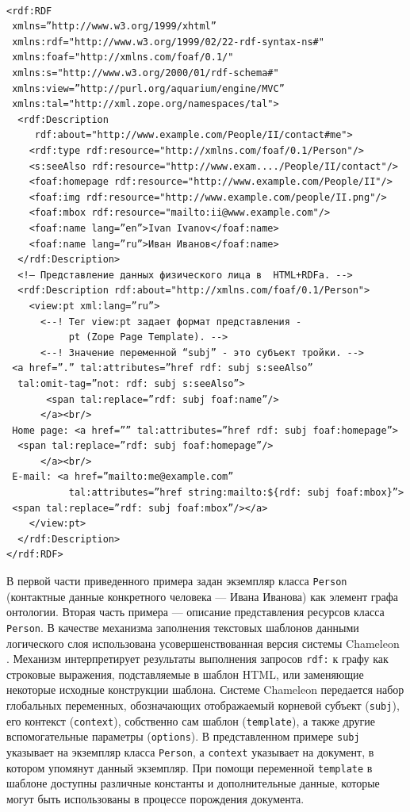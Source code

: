 \documentclass[utf8]{../IncArticle}
\begin{document}
\begingroup%
\tt%
\begin{verbatim}
<rdf:RDF
 xmlns=”http://www.w3.org/1999/xhtml”
 xmlns:rdf="http://www.w3.org/1999/02/22-rdf-syntax-ns#"
 xmlns:foaf="http://xmlns.com/foaf/0.1/"
 xmlns:s="http://www.w3.org/2000/01/rdf-schema#"
 xmlns:view=”http://purl.org/aquarium/engine/MVC”
 xmlns:tal="http://xml.zope.org/namespaces/tal">
  <rdf:Description
     rdf:about="http://www.example.com/People/II/contact#me">
    <rdf:type rdf:resource="http://xmlns.com/foaf/0.1/Person"/>
    <s:seeAlso rdf:resource="http://www.exam..../People/II/contact"/>
    <foaf:homepage rdf:resource="http://www.example.com/People/II"/>
    <foaf:img rdf:resource="http://www.example.com/people/II.png"/>
    <foaf:mbox rdf:resource="mailto:ii@www.example.com"/>
    <foaf:name lang=”en”>Ivan Ivanov</foaf:name>
    <foaf:name lang=”ru”>Иван Иванов</foaf:name>
  </rdf:Description>
  <!— Представление данных физического лица в  HTML+RDFa. -->
  <rdf:Description rdf:about="http://xmlns.com/foaf/0.1/Person">
    <view:pt xml:lang=”ru”>
      <--! Тег view:pt задает формат представления -
           pt (Zope Page Template). -->
      <--! Значение переменной “subj” - это субъект тройки. -->
 <a href=”.” tal:attributes=”href rdf: subj s:seeAlso”
  tal:omit-tag=”not: rdf: subj s:seeAlso”>
       <span tal:replace=”rdf: subj foaf:name”/>
      </a><br/>
 Home page: <a href=”” tal:attributes=”href rdf: subj foaf:homepage”>
  <span tal:replace=”rdf: subj foaf:homepage”/>
      </a><br/>
 E-mail: <a href=”mailto:me@example.com”
           tal:attributes=”href string:mailto:${rdf: subj foaf:mbox}”>
 <span tal:replace=”rdf: subj foaf:mbox”/></a>
    </view:pt>
  </rdf:Description>
</rdf:RDF>
\end{verbatim}%
\endgroup

В первой части приведенного примера задан экземпляр класса
\texttt{Person} (контактные данные конкретного человека --- Ивана
Иванова) как элемент графа онтологии.  Вторая часть примера ---
описание представления ресурсов класса \texttt{Person}.  В качестве
механизма заполнения текстовых шаблонов данными логического слоя
использована усовершенствованная версия системы Chameleon \cite{q2}.
Механизм интерпретирует результаты выполнения запросов \texttt{rdf:} к
графу как строковые выражения, подставляемые в шаблон HTML, или
заменяющие некоторые исходные конструкции шаблона.  Системе Chameleon передается
набор глобальных переменных, обозначающих отображаемый корневой
субъект (\texttt{subj}), его контекст (\texttt{context}), собственно
сам шаблон (\texttt{template}), а также другие вспомогательные
параметры (\texttt{options}).  В представленном примере \texttt{subj}
указывает на экземпляр класса \texttt{Person}, а \texttt{context}
указывает на документ, в котором упомянут данный экземпляр.  При помощи
переменной \texttt{template} в шаблоне доступны различные константы и
дополнительные данные, которые могут быть использованы в процессе
порождения документа.
\end{document}
